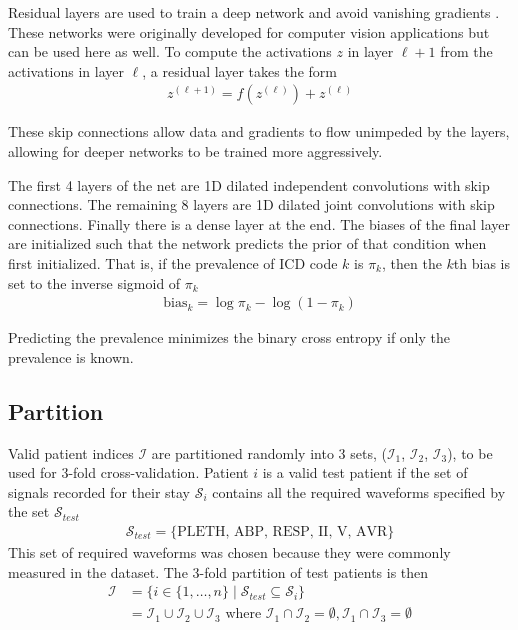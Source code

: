 Residual layers are used to train a deep network and avoid vanishing gradients \cite{he2016deep}.  These networks were originally developed for computer vision applications but can be used here as well.  To compute the activations $z$ in layer $\ell + 1$ from the activations in layer $\ell$, a residual layer takes the form
\begin{gather}
    z^{(\ell + 1)} = f(z^{(\ell)}) + z^{(\ell)}
\end{gather}

These skip connections allow data and gradients to flow unimpeded by the layers, allowing for deeper networks to be trained more aggressively.

The first 4 layers of the net are 1D dilated independent convolutions with skip connections.  The remaining 8 layers are 1D dilated joint convolutions with skip connections.  Finally there is a dense layer at the end.  The biases of the final layer are initialized such that the network predicts the prior of that condition when first initialized.  That is, if the prevalence of ICD code $k$ is $\pi_k$, then the $k$th bias is set to the inverse sigmoid of $\pi_k$
\begin{gather}
    \text{bias}_k = \log \pi_k - \log(1 - \pi_k)
\end{gather}

Predicting the prevalence minimizes the binary cross entropy if only the prevalence is known.


\subsection{Partition}

Valid patient indices $\mathcal{I}$ are partitioned randomly into 3 sets, ($\mathcal{I}_1$, $\mathcal{I}_2$, $\mathcal{I}_3$), to be used for 3-fold cross-validation.  Patient $i$ is a valid test patient if the set of signals recorded for their stay $\mathcal{S}_i$ contains all the required waveforms specified by the set $\mathcal{S}_{test}$
\begin{gather}
    \mathcal{S}_{test} = \{ \text{PLETH, ABP, RESP, II, V, AVR} \}
\end{gather}
This set of required waveforms was chosen because they were commonly measured in the dataset.  The 3-fold partition of test patients is then
\begin{align}
    \mathcal{I} 
        &= \{
            i \in \{1, \dots, n\} \mid 
            \mathcal{S}_{test} \subseteq \mathcal{S}_i
        \} \\
        &= \mathcal{I}_1 \cup \mathcal{I}_2 \cup \mathcal{I}_3 \text{ where }
            \mathcal{I}_1 \cap \mathcal{I}_2 = \emptyset, \mathcal{I}_1 \cap \mathcal{I}_3 = \emptyset
\end{align}


